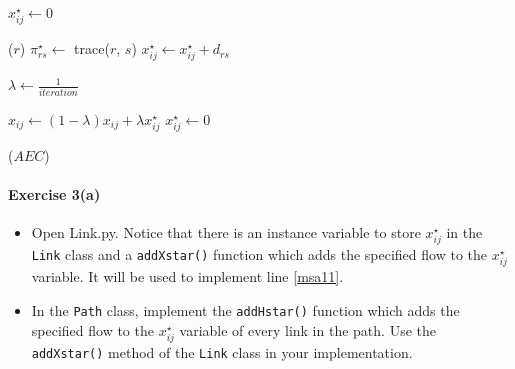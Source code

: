 \documentclass[11pt]{article}
\newcommand{\A}{\mathcal{A}}
\newcommand{\Z}{\mathcal{Z}}
\begin{document}
\begin{algorithmic}[1]
	\For{$(i,j)\in\A$} 
	\State $x^\star_{ij} \leftarrow 0$
	\EndFor
	
	\vspace{0.5\baselineskip}
	
	 \label{msa5}
	\For{$r\in\Z$}  \label{msa6}
	($r$) 
	\For{$s\in\Z$}
	\State $\pi^\star_{rs} \leftarrow$ {\sc trace($r$, $s$)}
	 
	\State $x^\star_{ij} \leftarrow x^\star_{ij} + d_{rs}$ \label{msa11}
	\EndFor
	\EndFor
	\EndFor \label{msa14}
	
	\vspace{0.5\baselineskip}
	
	
	\State $\lambda \leftarrow \frac{1}{iteration}$  \label{msa15}
	
	\vspace{0.5\baselineskip}
	
	\For{$(i,j)\in\A$}  \label{msa16}
	\State $x_{ij} \leftarrow (1-\lambda)x_{ij} + \lambda x^\star_{ij}$ \label{msa17}
	\State $x^\star_{ij}\leftarrow 0$ \label{msa18}
	\EndFor
	
	\vspace{0.5\baselineskip}
	
	($AEC$) 
	
	\EndFor
	\EndProcedure
\end{algorithmic}


\paragraph*{Exercise 3(a)} 
\begin{itemize}
	\item Open Link.py. Notice that there is an instance variable to store $x^\star_{ij}$ in the \texttt{Link} class and a \texttt{addXstar()} function which adds the specified flow to the $x^\star_{ij}$ variable.
	It will be used to implement line \ref{msa11}. 
	
	\item In the \texttt{Path} class, implement the \texttt{addHstar()} function which adds the specified flow to the $x^\star_{ij}$ variable of every link in the path. Use the \texttt{addXstar()} method of the \texttt{Link} class in your implementation.
\end{itemize}
\end{document}
